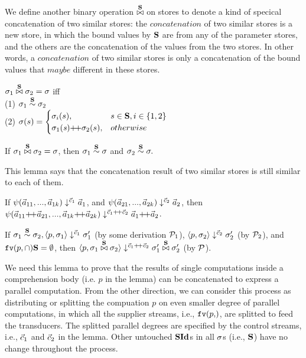 We define another binary operation $\x\S$ on stores to denote a kind of specical concatenation of two similar stores: 
the $concatenation$ of two similar stores is a new store, in which the bound values by $\S$ are from any of the parameter stores, and 
the others are the concatenation of the values from the two stores. 
In other words, a $concatenation$ of two similar stores is only a concatenation of the bound values that $maybe$ different in these stores.
\begin{defi}
	\label{def-sgm-join}
	$\sgm_1 \x{\S} \sgm_2 = \sgm$ iff \\
	(1) $\sgm_1 \~{\S} \sgm_2$  \\
	(2) $\sgm(s) =
	\begin{cases}
	\sgm_i(s),& s \in \S, i \in \{1,2\}\\
	\sgm_1(\s) {\++} \sgm_2(s), & otherwise \\
	\end{cases} $
\end{defi}

\begin{lem} \label{lem-join1}
	If $\sgm_1 \x{\S} \sgm_2 = \sgm$, 
	then $\sgm_1 \~{\S} \sgm$ and $\sgm_2 \~{\S} \sgm.$
\end{lem}
This lemma says that the concatenation result of two similar stores is still similar to each of them.


\begin{lem} \label{lem-psi-join}
	If $\sevalfg{\lcall}{\a_{11},...,\a_{1k}}{\c_1}{\a_1}$,
	and $\sevalfg{\lcall}{\a_{21},...,\a_{2k}}{\c_2}{\a_2}$,
	then $\sevalfg{\lcall}{\a_{11} {\++} \a_{21},...,\a_{1k} {\++} \a_{2k}}{\c_1 {\++} \c_2}{\a_1 {\++} \a_2}$.
\end{lem}

\begin{lem}  \label{lem-sgm-join}
	If $\sgm_1 \~{\S} \sgm_2, 
	\seval{p}{\sgm_1}{\c_1}{\sgm_1'}$ (by some derivation $\MP_1$),
	$\seval{p}{\sgm_2} {\c_2} {\sgm_2'}$ (by $\MP_2$),
	and $\FV{p} \cap \S = \emptyset $,
	then $\seval{p}{\sgm_1 \x\S \sgm_2}{\c_1 {\++} \c_2}{ \sgm_1' \x\S \sgm_2' }$ (by $\MP$).
\end{lem}

We need this lemma to prove that the results of single computations inside a comprehension body (i.e. $p$ in the lemma) can be concatenated to express a parallel computation. From the other direction, we can consider this process as distributing or splitting the compuation $p$ on even smaller degree of parallel computations, in which all the supplier streams, i.e., $\FV{p}$, are splitted to
feed the transducers. The splitted parallel degrees are specified by the
control streams, i.e., $\c_1$ and $\c_2$ in the lemma. Other untouched $\SId$s in all $\sgm$s (i.e., $\S$) have no change throughout the process.\\




